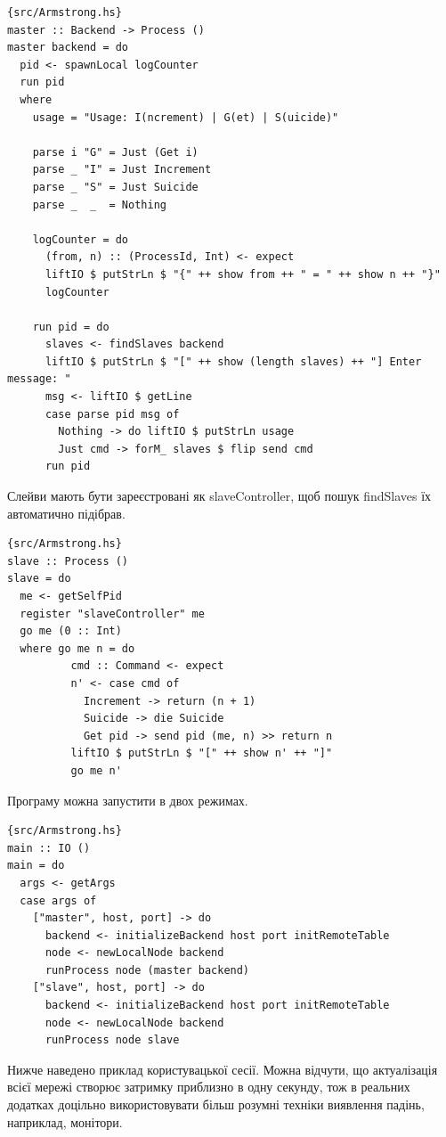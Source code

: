 \documentclass[12pt]{article}
\begin{document}
\begin{lstlisting}{src/Armstrong.hs}
master :: Backend -> Process ()
master backend = do
  pid <- spawnLocal logCounter
  run pid
  where
    usage = "Usage: I(ncrement) | G(et) | S(uicide)"
    
    parse i "G" = Just (Get i)
    parse _ "I" = Just Increment
    parse _ "S" = Just Suicide
    parse _  _  = Nothing

    logCounter = do
      (from, n) :: (ProcessId, Int) <- expect
      liftIO $ putStrLn $ "{" ++ show from ++ " = " ++ show n ++ "}"
      logCounter
      
    run pid = do
      slaves <- findSlaves backend
      liftIO $ putStrLn $ "[" ++ show (length slaves) ++ "] Enter message: "
      msg <- liftIO $ getLine
      case parse pid msg of
        Nothing -> do liftIO $ putStrLn usage
        Just cmd -> forM_ slaves $ flip send cmd
      run pid
\end{lstlisting}

Слейви мають бути зареєстровані як slaveController, щоб пошук findSlaves їх автоматично підібрав.\\

\begin{lstlisting}{src/Armstrong.hs}
slave :: Process ()
slave = do
  me <- getSelfPid
  register "slaveController" me
  go me (0 :: Int)
  where go me n = do
          cmd :: Command <- expect
          n' <- case cmd of
            Increment -> return (n + 1)
            Suicide -> die Suicide
            Get pid -> send pid (me, n) >> return n
          liftIO $ putStrLn $ "[" ++ show n' ++ "]"
          go me n'
\end{lstlisting}

Програму можна запустити в двох режимах.\\

\begin{lstlisting}{src/Armstrong.hs}
main :: IO ()
main = do
  args <- getArgs
  case args of
    ["master", host, port] -> do
      backend <- initializeBackend host port initRemoteTable
      node <- newLocalNode backend
      runProcess node (master backend)
    ["slave", host, port] -> do
      backend <- initializeBackend host port initRemoteTable
      node <- newLocalNode backend
      runProcess node slave
\end{lstlisting}

Нижче наведено приклад користувацької сесії. Можна відчути, що актуалізація всієї мережі створює затримку приблизно в одну секунду, тож в реальних додатках доцільно використовувати більш розумні техніки виявлення падінь, наприклад, монітори.\\
\end{document}
